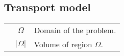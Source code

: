 \subsection*{Transport model}
\begin{tabular}{ccl}
	\phantom{notat}
	& $\Omega$ & Domain of the problem.\\
	& $|\Omega|$ & Volume of region $\Omega$.\\	
\end{tabular}
